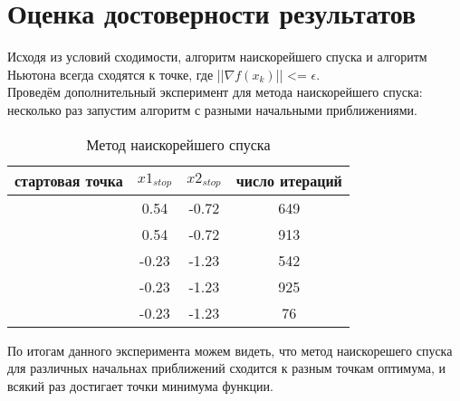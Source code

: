 \documentclass[a4]{article}
\begin{document}
			\section{Оценка достоверности результатов}
				Исходя из условий сходимости, алгоритм наискорейшего спуска и алгоритм Ньютона всегда сходятся к точке, где ||$\nabla f(x_k)$|| <= $\epsilon$.\\
				
				Проведём дополнительный эксперимент для метода наискорейшего спуска: несколько раз запустим алгоритм с разными начальными приближениями.\\
				\newpage
				\begin{table}[h!]
					
					\caption{Метод наискорейшего спуска}
					\label{tab:my_label}
					\begin{center}
						\vspace{5mm}
						\begin{tabular}{|c|c|c|c}
							\hline
							стартовая точка & $x1_{stop}$ & $x2_{stop}$ & число итераций \\
							\hline
							[0.0; 0.0] & 0.54 & -0.72 & 649\\
							\hline
							[2.0; 5.0] & 0.54 & -0.72 & 913\\
							\hline
							[-1.0; -1.0] & -0.23 & -1.23 & 542\\
							\hline
							[-5.0; 5.0] & -0.23 & -1.23 & 925\\
							\hline
							[-0.25; -1.25]& -0.23 & -1.23 & 76\\
							\hline
						\end{tabular}
						
					\end{center}
					
				\end{table}
			
			По итогам данного эксперимента можем видеть, что метод наискорешего спуска для различных начальнах приближений сходится к разным точкам оптимума, и всякий раз достигает точки минимума функции.
\end{document}
